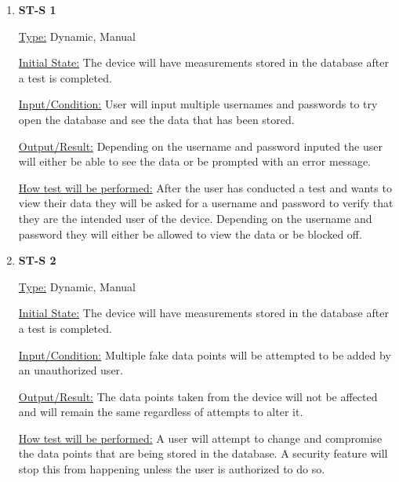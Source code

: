 \documentclass[12pt, titlepage]{article}
\begin{document}
\begin{enumerate}

  \item{\bf{ST-S 1}}

  \underline{Type:} Dynamic, Manual
            
  \underline{Initial State:} The device will have measurements stored in the database after a test is completed.
            
  \underline{Input/Condition:} User will input multiple usernames and passwords to try open the database and see the data that has been stored.
            
  \underline{Output/Result:} Depending on the username and password inputed the user will either be able to see the data or be prompted with an error message.
            
  \underline{How test will be performed:} After the user has conducted a test and wants to view their data they will be asked for a username and password to verify that they are the intended user of the device. Depending on the username and password they will either be allowed to view the data or be blocked off.

  
  \item{\bf{ST-S 2}}
  
  \underline{Type:} Dynamic, Manual
            
  \underline{Initial State:} The device will have measurements stored in the database after a test is completed.
            
  \underline{Input/Condition:} Multiple fake data points will be attempted to be added by an unauthorized user.
            
  \underline{Output/Result:} The data points taken from the device will not be affected and will remain the same regardless of attempts to alter it.
            
  \underline{How test will be performed:} A user will attempt to change and compromise the data points that are being stored in the database. A security feature will stop this from happening unless the user is authorized to do so.
  

  
\end{enumerate}

\end{document}
